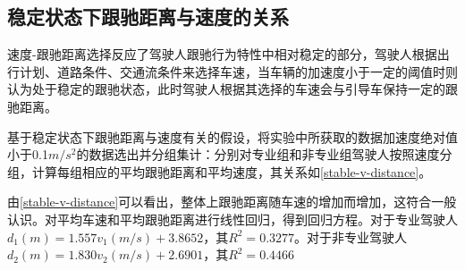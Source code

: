 

\subsection{稳定状态下跟驰距离与速度的关系}
速度-跟驰距离选择反应了驾驶人跟驰行为特性中相对稳定的部分，驾驶人根据出行计划、道路条件、交通流条件来选择车速，当车辆的加速度小于一定的阈值时则认为处于稳定的跟驰状态，此时驾驶人根据其选择的车速会与引导车保持一定的跟驰距离。

基于稳定状态下跟驰距离与速度有关的假设，将实验中所获取的数据加速度绝对值小于0.1$m/s^2$的数据选出并分组集计：分别对专业组和非专业组驾驶人按照速度分组，计算每组相应的平均跟驰距离和平均速度，其关系如\autoref{stable-v-distance}。

由\autoref{stable-v-distance}可以看出，整体上跟驰距离随车速的增加而增加，这符合一般认识。对平均车速和平均跟驰距离进行线性回归，得到回归方程。对于专业驾驶人$d_1(m)=1.557 v_1(m/s) + 3.8652$，其$R^2=0.3277$。对于非专业驾驶人$d_2(m)=1.830 v_2(m/s) + 2.6901$，其$R^2=0.4466$

